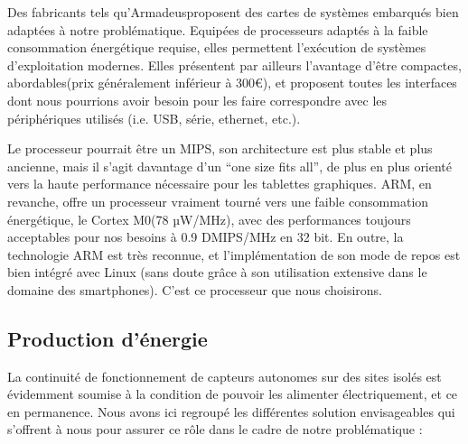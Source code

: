 Des fabricants tels qu'Armadeus\footnotemark proposent des cartes de systèmes embarqués bien adaptées à notre problématique. Equipées de processeurs adaptés à la faible consommation énergétique requise, elles permettent l'exécution de systèmes d'exploitation modernes. Elles présentent par ailleurs l'avantage d'être compactes, abordables\footnotemark (prix généralement inférieur à 300\euro ), et proposent toutes les interfaces dont nous pourrions avoir besoin pour les faire correspondre avec les périphériques utilisés (i.e. USB, série, ethernet, etc.).



Le processeur pourrait être un MIPS\footnotemark, son architecture est plus stable et plus ancienne, mais il s'agit davantage d'un ``one size fits all'', de plus en plus orienté vers la haute performance nécessaire pour les tablettes graphiques\footnotemark. ARM, en revanche, offre un processeur vraiment tourné vers une faible consommation énergétique, le Cortex M0\footnotemark (78 µW/MHz), avec des performances toujours acceptables pour nos besoins à 0.9 DMIPS/MHz en 32 bit. En outre, la technologie ARM est très reconnue, et l'implémentation de son mode de repos est bien intégré avec Linux (sans doute grâce à son utilisation extensive dans le domaine des smartphones). C'est ce processeur que nous choisirons.




\subsection{Production d'énergie}

La continuité de fonctionnement de capteurs autonomes sur des sites isolés est évidemment soumise à la condition de pouvoir les alimenter électriquement, et ce en permanence. Nous avons ici regroupé les différentes solution envisageables qui s’offrent à nous pour assurer ce rôle dans le cadre de notre problématique :

